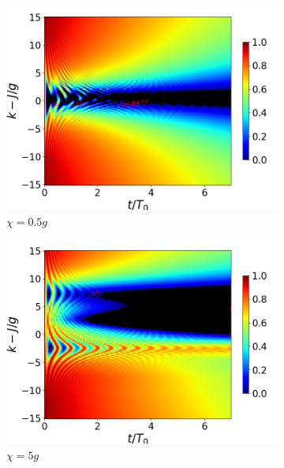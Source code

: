 \begin{figure}[h!]
    \begin{subfigure}{0.49\textwidth}
        \includegraphics[width=\textwidth]{figuras/ch4/concu/k/eg1+ge1 d=0.0g x=0.5g J=15.0g gamma=0.25g concu k dis.png}
        \caption{$\chi=0.5g$}
        \label{fig4:concu k 1 x1}
    \end{subfigure}
    \hfill
    \begin{subfigure}{0.49\textwidth}
        \includegraphics[width=\textwidth]{figuras/ch4/concu/k/eg1+ge1 d=0.0g x=5.0g J=15.0g gamma=0.25g concu k dis.png}
        \caption{$\chi=5g$}
        \label{fig4:concu k 1 x2}
    \end{subfigure}
    \caption{}
    \label{fig4:concu k params 1}
\end{figure}
